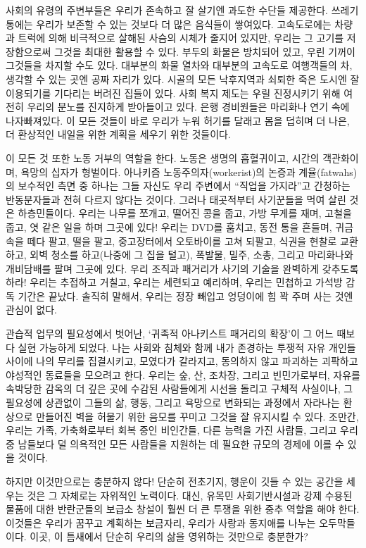 \documentclass[11pt, b6paper, openany]{memoir}
\begin{document}
\begin{article}
사회의 유령의 주변부들은 우리가 존속하고 잘 살기엔 과도한 수단들 제공한다. 쓰레기통에는 우리가 보존할 수 있는 것보다 더 많은 음식들이 쌓여있다. 고속도로에는 차량과 트럭에 의해 비극적으로 살해된 사슴의 시체가 줄지어 있지만, 우리는 그 고기를 저장함으로써 그것을 최대한 활용할 수 있다. 부두의 화물은 방치되어 있고, 우린 기꺼이 그것들을 차지할 수도 있다. 대부분의 화물 열차와 대부분의 고속도로 여행객들의 차, 생각할 수 있는 곳엔 공짜 자리가 있다. 시골의 모든 낙후지역과 쇠퇴한 죽은 도시엔 잘 이용되기를 기다리는 버려진 집들이 있다. 사회 복지 제도는 우릴 진정시키기 위해 여전히 우리의 분노를 진지하게 받아들이고 있다. 은행 경비원들은 마리화나 연기 속에 나자빠져있다. 이 모든 것들이 바로 우리가 누워 허기를 달래고 몸을 덥히며 더 나은, 더 환상적인 내일을 위한 계획을 세우기 위한 것들이다.

이 모든 것 또한 노동 거부의 역할을 한다. 노동은 생명의 흡혈귀이고, 시간의 객관화이며, 욕망의 십자가 형벌이다. 아나키즘 노동주의자(workerist)의 논증과 계율(fatwahs)의 보수적인 측면 중 하나는 그들 자신도 우리 주변에서 “직업을 가지라”고 간청하는 반동분자들과 전혀 다르지 않다는 것이다. 그러나 태곳적부터 사기꾼들을 먹여 살린 것은 하층민들이다. 우리는 나무를 쪼개고, 떨어진 콩을 줍고, 가방 무게를 재며, 고철을 줍고, 엿 같은 일을 하며 그곳에 있다! 우리는 DVD를 훔치고, 동전 통을 흔들며, 귀금속을 떼다 팔고, 떨을 팔고, 중고장터에서 오토바이를 고쳐 되팔고, 식권을 현찰로 교환하고, 외벽 청소를 하고(나중에 그 집을 털고), 폭발물, 밀주, 소총, 그리고 마리화나와 개비담배를 팔며 그곳에 있다. 우리 조직과 패거리가 사기의 기술을 완벽하게 갖추도록 하라! 우리는 추접하고 거칠고, 우리는 세련되고 예리하며, 우리는 민첩하고 가석방 감독 기간은 끝났다. 솔직히 말해서, 우리는 정장 빼입고 엉덩이에 힘 꽉 주며 사는 것엔 관심이 없다.

관습적 업무의 필요성에서 벗어난, ‘귀족적 아나키스트 패거리의 확장’이 그 어느 때보다 실현 가능하게 되었다. 나는 사회와 침체와 함께 내가 존경하는 투쟁적 자유 개인들 사이에 나의 무리를 집결시키고, 모였다가 갈라지고, 동의하지 않고 파괴하는 괴팍하고 야성적인 동료들을 모으려고 한다. 우리는 숲, 산, 조차장, 그리고 빈민가로부터, 자유를 속박당한 감옥의 더 깊은 곳에 수감된 사람들에게 시선을 돌리고 구체적 사실이나, 그 필요성에 상관없이 그들의 삶, 행동, 그리고 욕망으로 변화되는 과정에서 자라나는 환상으로 만들어진 벽을 허물기 위한 음모를 꾸미고 그것을 잘 유지시킬 수 있다. 조만간, 우리는 가족, 가축화로부터 회복 중인 비인간들, 다른 능력을 가진 사람들, 그리고 우리 중 남들보다 덜 의욕적인 모든 사람들을 지원하는 데 필요한 규모의 경제에 이를 수 있을 것이다. 

하지만 이것만으로는 충분하지 않다! 단순히 전초기지, 행운이 깃들 수 있는 공간을 세우는 것은 그 자체로는 자위적인 노력이다. 대신, 유목민 사회기반시설과 강제 수용된 물품에 대한 반란군들의 보급소 창설이 훨씬 더 큰 투쟁을 위한 중추 역할을 해야 한다. 이것들은 우리가 꿈꾸고 계획하는 보금자리, 우리가 사랑과 동지애를 나누는 오두막들이다. 이곳, 이 틈새에서 단순히 우리의 삶을 영위하는 것만으로 충분한가? 


\end{article}
\end{document}
